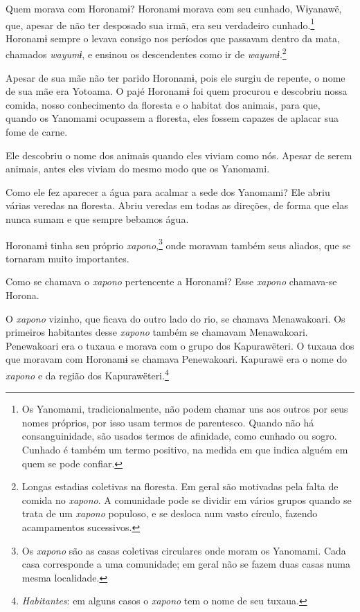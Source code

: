 Quem morava com Horonamɨ? Horonamɨ morava com seu cunhado, Wɨyanawë,
que, apesar de não ter desposado sua irmã, era seu verdadeiro
cunhado.\footnote{Os Yanomami, tradicionalmente, não podem chamar uns aos outros por seus nomes próprios, por isso usam termos de parentesco. Quando não há
consanguinidade, são usados termos de afinidade, como cunhado ou sogro.
Cunhado é também um termo positivo, na medida em que indica alguém em
quem se pode confiar.} Horonamɨ sempre o levava consigo nos
períodos que passavam dentro da mata, chamados \textit{wayumɨ}, e ensinou
os descendentes como ir de \textit{wayumɨ}.\footnote{Longas estadias coletivas na floresta. Em geral são motivadas pela falta de comida no \textit{xapono}. A comunidade pode se dividir em vários grupos quando se trata de um \textit{xapono} populoso, e se desloca num vasto círculo, fazendo acampamentos sucessivos.}

Apesar de sua mãe não ter parido Horonamɨ, pois ele surgiu de repente, o
nome de sua mãe era Yotoama. O pajé Horonamɨ foi quem procurou e
descobriu nossa comida, nosso conhecimento da floresta e o habitat dos
animais, para que, quando os Yanomami ocupassem a floresta, eles fossem
capazes de aplacar sua fome de carne. 

Ele descobriu o nome dos animais quando eles viviam como nós. Apesar de
serem animais, antes eles viviam do mesmo modo que os Yanomami. 

Como ele fez aparecer a água para acalmar a sede dos Yanomami? Ele abriu
várias veredas na floresta. Abriu veredas em todas as direções, de forma
que elas nunca sumam e que sempre bebamos água. 

Horonamɨ tinha seu próprio \textit{xapono},\footnote{Os \textit{xapono} são as casas 
coletivas circulares onde moram os Yanomami. Cada casa corresponde 
a uma comunidade; em geral não se fazem duas casas numa mesma localidade.} onde moravam
também seus aliados, que se tornaram muito importantes. 

Como se chamava o \textit{xapono} pertencente a Horonamɨ? Esse \textit{xapono} chamava-se
Horona. 

O \textit{xapono} vizinho, que ficava do outro lado do rio, se chamava
Menawakoari. Os primeiros habitantes desse \textit{xapono} também se
chamavam Menawakoari. Penewakoari era o tuxaua e morava com o grupo dos
Kapurawëteri. O tuxaua dos que moravam com Horonamɨ se chamava
Penewakoari. Kapurawë era o nome do \textit{xapono} e da região dos
Kapurawëteri.\footnote{\textit{Habitantes}: em alguns casos o \textit{xapono} tem o nome de seu tuxaua.}

